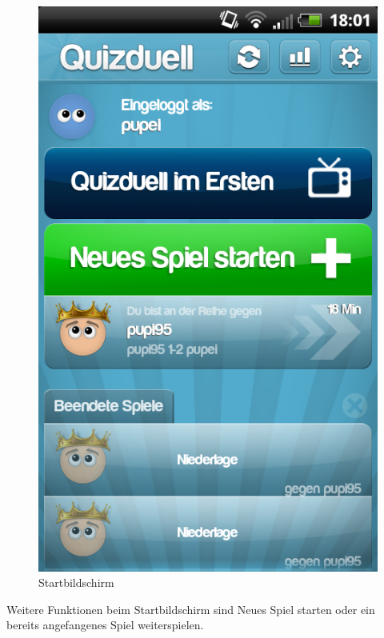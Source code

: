 \documentclass[fontsize=12pt,paper=a4,twoside]{scrartcl}
\begin{document}
\begin{figure}[H]
\centering
\includegraphics[scale=0.5]{Bilder/start.png}
\caption{Startbildschirm}
\end{figure}

Weitere Funktionen beim Startbildschirm sind Neues Spiel starten oder ein bereits angefangenes Spiel weiterspielen.\\
\end{document}
